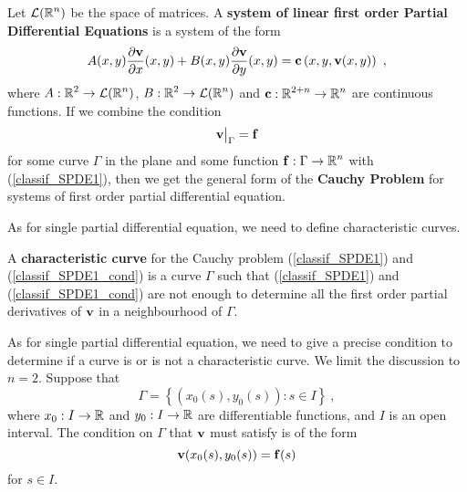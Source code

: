 Let $\displaystyle \mathcal{L}(\mathbb{R}^n)$ be the space of \nn matrices.  A
{\bfseries system of linear first order Partial Differential Equations}%
 is
a system of the form
\begin{equation} \label{classif_SPDE1}
A(x,y) \frac{\partial{\mathbf{v}}}{\partial x}(x,y) + B(x,y) \frac{\partial{\mathbf{v}}}{\partial y}(x,y) =
\mathbf{c}\left(x,y,\mathbf{v}(x,y)\right) \ ,
\end{equation}
where $\displaystyle A:\mathbb{R}^2\rightarrow \mathcal{L}(\mathbb{R}^n)$,
$\displaystyle B:\mathbb{R}^2\rightarrow \mathcal{L}(\mathbb{R}^n)$ and
$\displaystyle \mathbf{c}:\mathbb{R}^{2+n}\rightarrow \mathbb{R}^n$ are continuous functions.
If we combine the condition
\begin{equation} \label{classif_SPDE1_cond}
\mathbf{v}\big|_\Gamma = \mathbf{f}
\end{equation}
for some curve $\Gamma$ in the plane and some function
$\displaystyle \mathbf{f}:\Gamma \rightarrow \mathbb{R}^n$ with
(\ref{classif_SPDE1}), then we get the general form of the
{\bfseries Cauchy Problem} for systems of first
order partial differential equation. 

As for single partial differential equation, we need to define
characteristic curves.

\begin{defn}
A {\bfseries characteristic curve} for the
Cauchy problem (\ref{classif_SPDE1}) and (\ref{classif_SPDE1_cond}) is a
curve $\Gamma$ such that (\ref{classif_SPDE1}) and
(\ref{classif_SPDE1_cond}) are not enough to determine all
the first order partial derivatives of $\mathbf{v}$ in a neighbourhood of
$\Gamma$.
\end{defn}

As for single partial differential equation, we need to give a precise
condition to determine if a curve is or is not a characteristic curve.
We limit the discussion to $n=2$. Suppose that
\begin{equation} \label{classif_GammaEq2}
\Gamma = \left\{ (x_0(s), y_0(s)) : s \in I \right\} \ ,
\end{equation}
where $x_0:I\rightarrow \mathbb{R}$ and $y_0:I\rightarrow \mathbb{R}$ are
differentiable functions, and $I$ is an open interval.  The condition
on $\Gamma$ that $\mathbf{v}$ must satisfy is of the form
\begin{equation} \label{classif_SPDE1_c1}
\mathbf{v}(x_0(s),y_0(s)) = \mathbf{f}(s)
\end{equation}
for $s\in I$.

